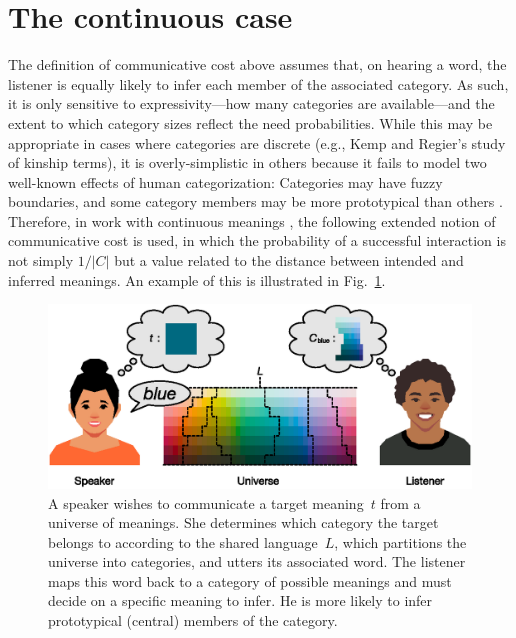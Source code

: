 \documentclass[a4paper, 11pt]{article}
\begin{document}

\section{The continuous case}

The definition of communicative cost above assumes that, on hearing a word, the listener is equally likely to infer each member of the associated category. As such, it is only sensitive to expressivity---how many categories are available---and the extent to which category sizes reflect the need probabilities. While this may be appropriate in cases where categories are discrete (e.g., Kemp and Regier's \citeyearpar{KempRegier:2012} study of kinship terms), it is overly-simplistic in others because it fails to model two well-known effects of human categorization: Categories may have fuzzy boundaries, and some category members may be more prototypical than others \citep{Rosch:1973}. Therefore, in work with continuous meanings \citep[such as the color term study in][]{Regier:2015}, the following extended notion of communicative cost is used, in which the probability of a successful interaction is not simply $1/|C|$ but a value related to the distance between intended and inferred meanings. An example of this is illustrated in Fig.~\ref{fg_comm_cost_continuous}.

	\begin{figure}
	\begin{center}
	\includegraphics[]{comm_cost_continuous.eps}
	\caption{A speaker wishes to communicate a target meaning~$t$ from a universe of meanings. She determines which category the target belongs to according to the shared language~$L$, which partitions the universe into categories, and utters its associated word. The listener maps this word back to a category of possible meanings and must decide on a specific meaning to infer. He is more likely to infer prototypical (central) members of the category.}
	\label{fg_comm_cost_continuous}
	\end{center}
	\end{figure}
\end{document}
